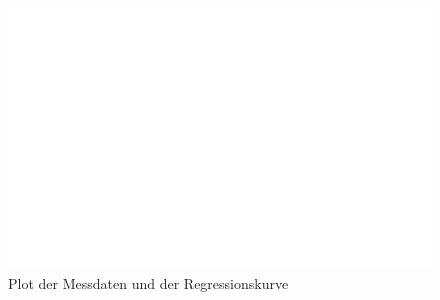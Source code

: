 \begin{figure}[H]
  \centering
  \includegraphics[width=1\textwidth]{build/plot.pdf}
  \caption{Plot der Messdaten und der Regressionskurve\protect\footnotemark}
  \label{fig:plot}
\end{figure}

\newpage

